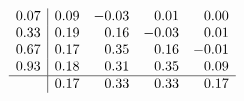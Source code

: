 \begin{frame}
\[\begin{array}{c@{\qquad\qquad}c}
\begin{array}{c|rrrr}
                0.07
                 & 0.09
                 & -0.03
                 & 0.01
                 & 0.00
                \\
                0.33
                 & 0.19
                 & 0.16
                 & -0.03
                 & 0.01
                \\
                0.67
                 & 0.17
                 & 0.35
                 & 0.16
                 & -0.01
                \\
                0.93
                 & 0.18
                 & 0.31
                 & 0.35
                 & 0.09
                \\ \hline
                 &
                0.17
                 & 0.33
                 & 0.33
                 & 0.17
            \end{array}
        \end{array}
    \]
\end{frame}

